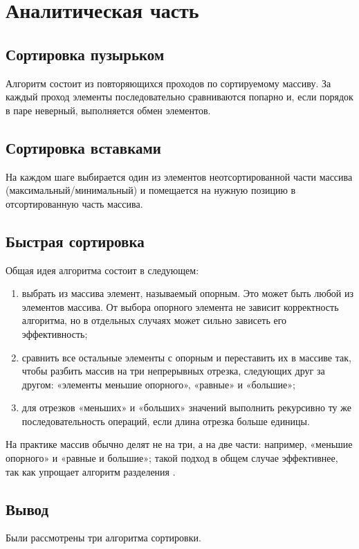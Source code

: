 \chapter{Аналитическая часть}

\section{Сортировка пузырьком}

Алгоритм \cite{knut} состоит из повторяющихся проходов по сортируемому массиву. За каждый проход элементы последовательно сравниваются попарно и, если порядок в паре неверный, выполняется обмен элементов.


\section{Сортировка вставками}

На каждом шаге выбирается один из элементов неотсортированной части массива (максимальный/минимальный) \cite{knut} и помещается на нужную позицию в отсортированную часть массива. 


\section{Быстрая сортировка}

Общая идея \cite{quick2} алгоритма состоит в следующем:


\begin{enumerate}

	\item выбрать из массива элемент, называемый опорным. Это может быть любой из элементов массива. От выбора опорного элемента не зависит корректность алгоритма, но в отдельных случаях может сильно зависеть его эффективность;
	\item сравнить все остальные элементы с опорным и переставить их в массиве так, чтобы разбить массив на три непрерывных отрезка, следующих друг за другом: «элементы меньшие опорного», «равные» и «большие»;

	\item для отрезков «меньших» и «больших» значений выполнить рекурсивно ту же последовательность операций, если длина отрезка больше единицы.

\end{enumerate}

На практике массив обычно делят не на три, а на две части: например, «меньшие опорного» и «равные и большие»; такой подход в общем случае эффективнее, так как упрощает алгоритм разделения \cite{quick1}.



\section*{Вывод}
Были рассмотрены три алгоритма сортировки.
